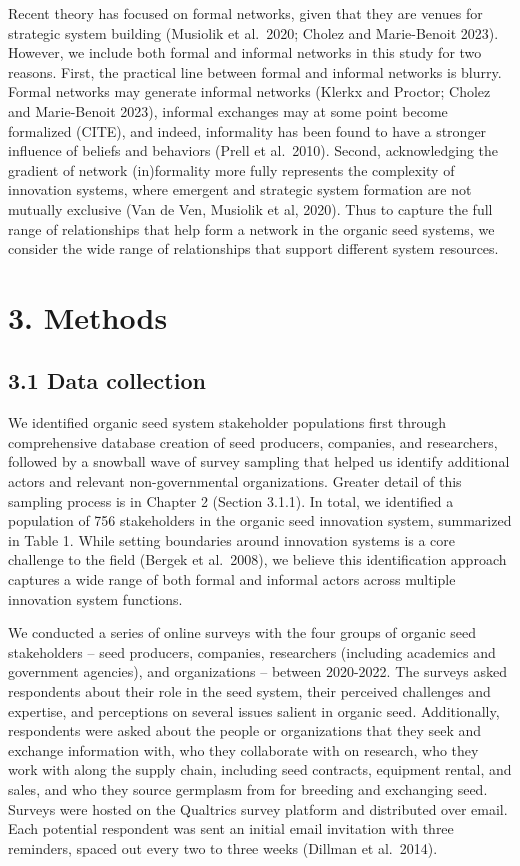 \documentclass[twoside,12pt,final]{ucthesis-CA2012}
\begin{document}
\begin{ucmainmatter}
Recent theory has focused on formal networks, given that they are venues
for strategic system building (Musiolik et al.~2020; Cholez and
Marie-Benoit 2023). However, we include both formal and informal
networks in this study for two reasons. First, the practical line
between formal and informal networks is blurry. Formal networks may
generate informal networks (Klerkx and Proctor; Cholez and Marie-Benoit
2023), informal exchanges may at some point become formalized (CITE),
and indeed, informality has been found to have a stronger influence of
beliefs and behaviors (Prell et al.~2010). Second, acknowledging the
gradient of network (in)formality more fully represents the complexity
of innovation systems, where emergent and strategic system formation are
not mutually exclusive (Van de Ven, Musiolik et al, 2020). Thus to
capture the full range of relationships that help form a network in the
organic seed systems, we consider the wide range of relationships that
support different system resources.

\hypertarget{methods-2}{%
\section{3. Methods}\label{methods-2}}

\hypertarget{data-collection}{%
\subsection{3.1 Data collection}\label{data-collection}}

We identified organic seed system stakeholder populations first through
comprehensive database creation of seed producers, companies, and
researchers, followed by a snowball wave of survey sampling that helped
us identify additional actors and relevant non-governmental
organizations. Greater detail of this sampling process is in Chapter 2
(Section 3.1.1). In total, we identified a population of 756
stakeholders in the organic seed innovation system, summarized in
Table 1. While setting boundaries around innovation systems is a core
challenge to the field (Bergek et al.~2008), we believe this
identification approach captures a wide range of both formal and
informal actors across multiple innovation system functions.

We conducted a series of online surveys with the four groups of organic
seed stakeholders -- seed producers, companies, researchers (including
academics and government agencies), and organizations -- between
2020-2022. The surveys asked respondents about their role in the seed
system, their perceived challenges and expertise, and perceptions on
several issues salient in organic seed. Additionally, respondents were
asked about the people or organizations that they seek and exchange
information with, who they collaborate with on research, who they work
with along the supply chain, including seed contracts, equipment rental,
and sales, and who they source germplasm from for breeding and
exchanging seed. Surveys were hosted on the Qualtrics survey platform
and distributed over email. Each potential respondent was sent an
initial email invitation with three reminders, spaced out every two to
three weeks (Dillman et al.~2014).


\end{ucmainmatter}
\end{document}
